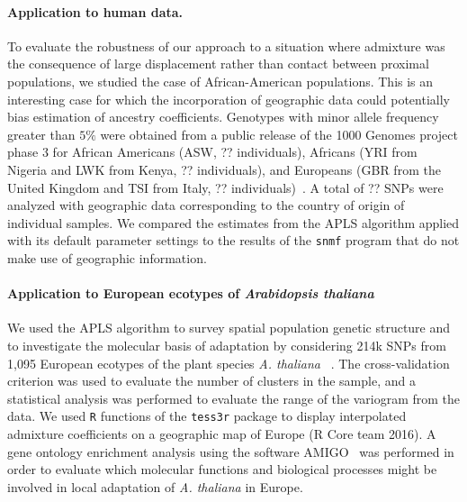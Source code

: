 \paragraph{Application to human data.} To evaluate the robustness of our
approach to a situation where admixture was the consequence of large
displacement rather than contact between proximal populations, we studied the
case of African-American populations. This is an interesting case for which the
incorporation of geographic data could potentially bias estimation of ancestry
coefficients. Genotypes with minor allele frequency greater than $5 \%$ were
obtained from a public release of the
1000 Genomes project phase 3 for African Americans (ASW,
?? individuals), Africans (YRI from Nigeria and LWK from Kenya, ?? individuals),
and Europeans (GBR from the United Kingdom and
TSI from Italy, ?? individuals)~\citep{1000genome}. A total of ?? SNPs were analyzed with geographic data
corresponding to the country of origin of individual samples. We compared the
estimates from the APLS algorithm applied with its default parameter settings to
the results of the {\tt snmf} program that do not make use of geographic information.

\paragraph{Application to European ecotypes of {\it Arabidopsis thaliana}} We
used the APLS algorithm to survey spatial population genetic structure and to
investigate the molecular basis of adaptation by considering 214k SNPs from
1,095 European ecotypes of the plant species {\it A. thaliana}
~\citep{Horton2012}. The cross-validation criterion was used to evaluate the
number of clusters in the sample, and a statistical analysis was performed to
evaluate the range of the variogram from the data. We used {\tt R} functions of
the {\tt tess3r} package to display interpolated admixture coefficients on a
geographic map of Europe (R Core team 2016). A gene ontology enrichment analysis
using the software AMIGO~\citep{Carbon2009} was performed in order to evaluate
which molecular functions and biological processes might be involved in local
adaptation of {\it A. thaliana} in Europe.


